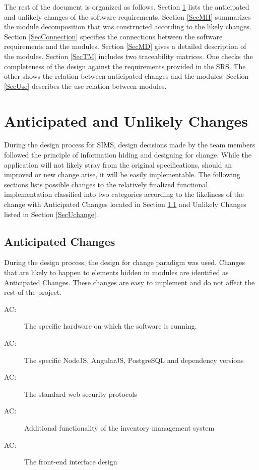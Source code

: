 \documentclass[12pt, titlepage]{article}
\newcounter{acnum}
\newcommand{\actheacnum}{AC\theacnum}
\begin{document}
The rest of the document is organized as follows. Section
\ref{SecChange} lists the anticipated and unlikely changes of the software
requirements. Section \ref{SecMH} summarizes the module decomposition that
was constructed according to the likely changes. Section \ref{SecConnection}
specifies the connections between the software requirements and the
modules. Section \ref{SecMD} gives a detailed description of the
modules. Section \ref{SecTM} includes two traceability matrices. One checks
the completeness of the design against the requirements provided in the SRS. The
other shows the relation between anticipated changes and the modules. Section
\ref{SecUse} describes the use relation between modules.

\section{Anticipated and Unlikely Changes} \label{SecChange}

During the design process for SIMS, design decisions made by the team members followed the principle of information hiding and designing for change. While the application will not likely stray from the original specifications, should an improved or new change arise, it will be easily implementable. The following sections lists possible changes to the relatively finalized functional implementation classified into two categories according to the likeliness of the change with Anticipated Changes located in Section \ref{SecAchange} and Unlikely Changes listed in Section \ref{SecUchange}.

\subsection{Anticipated Changes} \label{SecAchange}

During the design process, the design for change paradigm was used. Changes that are likely to happen to elements hidden in modules are identified as Anticipated Changes. These changes are easy to implement and do not affect the rest of the project. 

\begin{description}
\item[ \actheacnum \label{ac1}:] The specific hardware on which the software is running.
\item[ \actheacnum \label{ac2}:] The specific NodeJS, AngularJS, PostgreSQL and dependency versions
\item[ \actheacnum \label{ac3}:] The standard web security protocols
\item[ \actheacnum \label{ac4}:] Additional functionality of the inventory management system
\item[ \actheacnum \label{ac5}:] The front-end interface design
\end{description}
\end{document}
